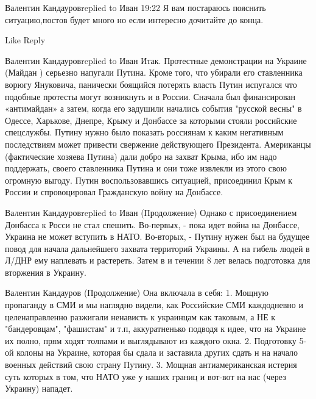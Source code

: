  
 
 
 
 


Валентин Кандауровreplied to Иван
19:22
Я вам постараюсь пояснить ситуацию,постов будет много но если интересно дочитайте до конца.

    Like
    Reply

Валентин Кандауровreplied to Иван
Итак. Протестные демонстрации на Украине (Майдан ) серьезно напугали Путина. Кроме того, что убирали его ставленника ворюгу Януковича, панически боящийся потерять власть Путин испугался что подобные протесты могут возникнуть и в России. Сначала был финансирован «антимайдан» а затем, когда его задушили начались события "русской весны" в Одессе, Харькове, Днепре, Крыму и Донбассе за которыми стояли российские спецслужбы. Путину нужно было показать россиянам к каким негативным последствиям может привести свержение действующего Президента. Американцы (фактические хозяева Путина) дали добро на захват Крыма, ибо им надо поддержать, своего ставленника Путина и они тоже извлекли из этого свою огромную выгоду. Путин воспользовавшись ситуацией, присоединил Крым к России и спровоцировал Гражданскую войну на Донбассе.

Валентин Кандауровreplied to Иван
(Продолжение) Однако с присоединением Донбасса к Росси не стал спешить. Во-первых, - пока идет война на Донбассе, Украина не может вступить в НАТО. Во-вторых, - Путину нужен был на будущее повод для начала дальнейшего захвата территорий Украины. А на гибель людей в Л/ДНР ему наплевать и растереть. Затем в и течении 8 лет велась подготовка для вторжения в Украину.

Валентин Кандауров
(Продолжение) Она включала в себя: 1. Мощную пропаганду в СМИ и мы наглядно видели, как Российские СМИ каждодневно и целенаправленно разжигали ненависть к украинцам как таковым, а НЕ к "бандеровцам", "фашистам" и т.п, аккуратненько подводя к идее, что на Украине их полно, прям ходят толпами и выглядывают из каждого окна. 2. Подготовку 5-ой колоны на Украине, которая бы сдала и заставила других сдать н на начало военных действий свою страну Путину. 3. Мощная антиамериканская истерия суть которых в том, что НАТО уже у наших границ и вот-вот на нас (через Украину) нападет.

